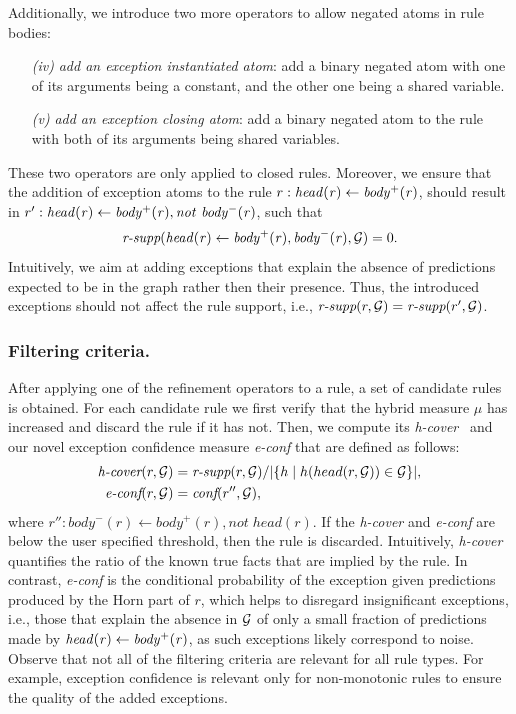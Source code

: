 Additionally, we introduce two more operators to allow negated atoms in rule bodies: 

\begin{enumerate}
\item[\it (iv)] \textit{add an exception instantiated atom}: add a binary negated atom with one of its arguments being a constant, and the other one being a shared variable. 
\item[\it (v)] \textit{add an exception closing atom}: add a binary negated atom to the rule with both of its arguments being shared variables.%
\end{enumerate}
%
These two operators are only applied to closed rules. 
Moreover, we ensure that the addition of exception atoms to the rule $r:\mathit{head(r)\leftarrow body^+(r)}$, 
should result in $r': \mathit{head(r)\leftarrow body^+(r), \mathit{not}~ body^-(r)}$, such that 
\[\textit{r-supp}(\mathit{head(r)\leftarrow body^+(r), body^-(r)},\mathcal{G})=0.\]
Intuitively, we aim at adding exceptions  
that explain the absence of predictions expected to be in the graph rather then their presence. Thus, the introduced exceptions should not affect the rule support, i.e., $\textit{r-supp}(r,\mathcal{G}) = \textit{r-supp}(r',\mathcal{G})$. 

\subsubsection{Filtering criteria.}
After applying one of the refinement operators to a rule, 
a set of candidate rules is obtained. 
For each candidate rule we first verify that the hybrid measure $\mu$ has increased and discard the rule if it has not. 
Then, we compute its \emph{h-cover}~\cite{amie} and our novel exception confidence measure \emph{e-conf} that are defined as follows:
\begin{align*}
	\textit{h-cover}(r,\mathcal{G}) & =
		\textit{r-supp}(r,\mathcal{G})/
		|\{h \mid 
				h(head(r,\mathcal{G})) \in \mathcal{G}\}|,\\
	\textit{e-conf}(r,\mathcal{G}) & =
		\textit{conf}(r'',\mathcal{G}),
\end{align*}
where $r'':body^-(r)\leftarrow body^+(r), not\;head(r)$.
If the \emph{h-cover} and \emph{e-conf} are below the user specified threshold, then the rule is discarded.
Intuitively, \emph{h-cover} quantifies the ratio of the known true facts that are implied by the rule.
In contrast, \emph{e-conf} is the conditional probability of the exception given predictions produced by the Horn part of $r$, which helps to disregard insignificant exceptions, i.e., those that explain the absence in $\mathcal{G}$ of only a small fraction of predictions made by $\mathit{head(r)}\leftarrow \mathit{body^+(r)}$, as such exceptions likely correspond to noise. 
%
Observe that not all of the filtering criteria are relevant for all rule types. For example, exception confidence is relevant only for non-monotonic rules to ensure the quality of the added exceptions.

